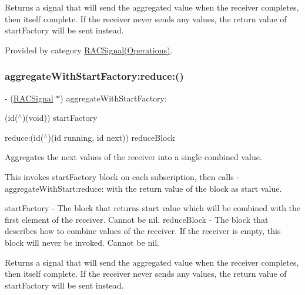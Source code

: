 Returns a signal that will send the aggregated value when the receiver completes, then itself complete. If the receiver never sends any values, the return value of {\ttfamily start\+Factory} will be sent instead. 

Provided by category \mbox{\hyperlink{category_r_a_c_signal_07_operations_08_a51c08c7a357f83c96c468a6aa13d4d87}{R\+A\+C\+Signal(\+Operations)}}.

\mbox{\label{interface_r_a_c_signal_a51c08c7a357f83c96c468a6aa13d4d87}} 
\subsubsection{\texorpdfstring{aggregate\+With\+Start\+Factory\+:reduce\+:()}{aggregateWithStartFactory:reduce:()}\hspace{0.1cm}{\footnotesize\ttfamily [3/3]}}
{\footnotesize\ttfamily -\/ (\mbox{\hyperlink{interface_r_a_c_signal}{R\+A\+C\+Signal}} $\ast$) aggregate\+With\+Start\+Factory\+: \begin{DoxyParamCaption}\item[{(id($^\wedge$)(void))}]{start\+Factory }\item[{reduce:(id($^\wedge$)(id running, id next))}]{reduce\+Block }\end{DoxyParamCaption}}

Aggregates the {\ttfamily next} values of the receiver into a single combined value.

This invokes {\ttfamily start\+Factory} block on each subscription, then calls -\/aggregate\+With\+Start\+:reduce\+: with the return value of the block as start value.

start\+Factory -\/ The block that returns start value which will be combined with the first element of the receiver. Cannot be nil. reduce\+Block -\/ The block that describes how to combine values of the receiver. If the receiver is empty, this block will never be invoked. Cannot be nil.

Returns a signal that will send the aggregated value when the receiver completes, then itself complete. If the receiver never sends any values, the return value of {\ttfamily start\+Factory} will be sent instead. 

